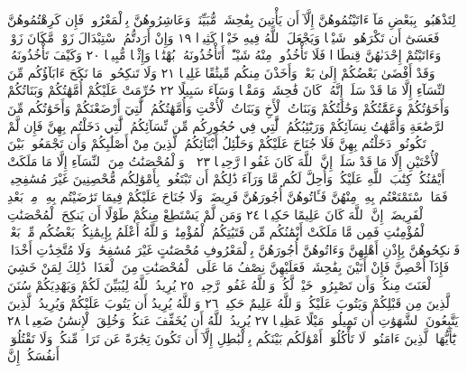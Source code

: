 لِتَذْهَبُوا۟ بِبَعْضِ مَآ ءَاتَيْتُمُوهُنَّ إِلَّآ أَن يَأْتِينَ بِفَٰحِشَةࣲ
مُّبَيِّنَةࣲۚ وَعَاشِرُوهُنَّ بِٱلْمَعْرُوفِۚ فَإِن كَرِهْتُمُوهُنَّ فَعَسَىٰٓ
أَن تَكْرَهُوا۟ شَيْـࣰٔا وَيَجْعَلَ ٱللَّهُ فِيهِ خَيْرࣰا كَثِيرࣰا ١٩
وَإِنْ أَرَدتُّمُ ٱسْتِبْدَالَ زَوْجࣲ مَّكَانَ زَوْجࣲ وَءَاتَيْتُمْ
إِحْدَىٰهُنَّ قِنطَارࣰا فَلَا تَأْخُذُوا۟ مِنْهُ شَيْـًٔاۚ أَتَأْخُذُونَهُۥ
بُهْتَٰنࣰا وَإِثْمࣰا مُّبِينࣰا ٢٠ وَكَيْفَ تَأْخُذُونَهُۥ وَقَدْ أَفْضَىٰ
بَعْضُكُمْ إِلَىٰ بَعْضࣲ وَأَخَذْنَ مِنكُم مِّيثَٰقًا غَلِيظࣰا ٢١
وَلَا تَنكِحُوا۟ مَا نَكَحَ ءَابَآؤُكُم مِّنَ ٱلنِّسَآءِ
إِلَّا مَا قَدْ سَلَفَۚ إِنَّهُۥ كَانَ فَٰحِشَةࣰ وَمَقْتࣰا وَسَآءَ
سَبِيلًا ٢٢ حُرِّمَتْ عَلَيْكُمْ أُمَّهَٰتُكُمْ وَبَنَاتُكُمْ
وَأَخَوَٰتُكُمْ وَعَمَّٰتُكُمْ وَخَٰلَٰتُكُمْ وَبَنَاتُ
ٱلْأَخِ وَبَنَاتُ ٱلْأُخْتِ وَأُمَّهَٰتُكُمُ ٱلَّٰتِيٓ أَرْضَعْنَكُمْ
وَأَخَوَٰتُكُم مِّنَ ٱلرَّضَٰعَةِ وَأُمَّهَٰتُ نِسَآئِكُمْ
وَرَبَٰٓئِبُكُمُ ٱلَّٰتِي فِي حُجُورِكُم مِّن نِّسَآئِكُمُ
ٱلَّٰتِي دَخَلْتُم بِهِنَّ فَإِن لَّمْ تَكُونُوا۟ دَخَلْتُم بِهِنَّ فَلَا
جُنَاحَ عَلَيْكُمْ وَحَلَٰٓئِلُ أَبْنَآئِكُمُ ٱلَّذِينَ مِنْ
أَصْلَٰبِكُمْ وَأَن تَجْمَعُوا۟ بَيْنَ ٱلْأُخْتَيْنِ إِلَّا
مَا قَدْ سَلَفَۗ إِنَّ ٱللَّهَ كَانَ غَفُورࣰا رَّحِيمࣰا ٢٣
۞ وَٱلْمُحْصَنَٰتُ مِنَ ٱلنِّسَآءِ إِلَّا مَا مَلَكَتْ أَيْمَٰنُكُمْۖ
كِتَٰبَ ٱللَّهِ عَلَيْكُمْۚ وَأُحِلَّ لَكُم مَّا وَرَآءَ ذَٰلِكُمْ أَن تَبْتَغُوا۟
بِأَمْوَٰلِكُم مُّحْصِنِينَ غَيْرَ مُسَٰفِحِينَۚ فَمَا ٱسْتَمْتَعْتُم بِهِۦ
مِنْهُنَّ فَـَٔاتُوهُنَّ أُجُورَهُنَّ فَرِيضَةࣰۚ وَلَا جُنَاحَ عَلَيْكُمْ فِيمَا
تَرَٰضَيْتُم بِهِۦ مِنۢ بَعْدِ ٱلْفَرِيضَةِۚ إِنَّ ٱللَّهَ كَانَ عَلِيمًا
حَكِيمࣰا ٢٤ وَمَن لَّمْ يَسْتَطِعْ مِنكُمْ طَوْلًا أَن يَنكِحَ
ٱلْمُحْصَنَٰتِ ٱلْمُؤْمِنَٰتِ فَمِن مَّا مَلَكَتْ أَيْمَٰنُكُم مِّن
فَتَيَٰتِكُمُ ٱلْمُؤْمِنَٰتِۚ وَٱللَّهُ أَعْلَمُ بِإِيمَٰنِكُمۚ بَعْضُكُم
مِّنۢ بَعْضࣲۚ فَٱنكِحُوهُنَّ بِإِذْنِ أَهْلِهِنَّ وَءَاتُوهُنَّ أُجُورَهُنَّ
بِٱلْمَعْرُوفِ مُحْصَنَٰتٍ غَيْرَ مُسَٰفِحَٰتࣲ وَلَا مُتَّخِذَٰتِ
أَخْدَانࣲۚ فَإِذَآ أُحْصِنَّ فَإِنْ أَتَيْنَ بِفَٰحِشَةࣲ فَعَلَيْهِنَّ نِصْفُ
مَا عَلَى ٱلْمُحْصَنَٰتِ مِنَ ٱلْعَذَابِۚ ذَٰلِكَ لِمَنْ خَشِيَ ٱلْعَنَتَ
مِنكُمْۚ وَأَن تَصْبِرُوا۟ خَيْرࣱ لَّكُمْۗ وَٱللَّهُ غَفُورࣱ رَّحِيمࣱ ٢٥
يُرِيدُ ٱللَّهُ لِيُبَيِّنَ لَكُمْ وَيَهْدِيَكُمْ سُنَنَ ٱلَّذِينَ
مِن قَبْلِكُمْ وَيَتُوبَ عَلَيْكُمْۗ وَٱللَّهُ عَلِيمٌ حَكِيمࣱ ٢٦
وَٱللَّهُ يُرِيدُ أَن يَتُوبَ عَلَيْكُمْ وَيُرِيدُ ٱلَّذِينَ يَتَّبِعُونَ
ٱلشَّهَوَٰتِ أَن تَمِيلُوا۟ مَيْلًا عَظِيمࣰا ٢٧ يُرِيدُ ٱللَّهُ أَن يُخَفِّفَ
عَنكُمْۚ وَخُلِقَ ٱلْإِنسَٰنُ ضَعِيفࣰا ٢٨ يَٰٓأَيُّهَا ٱلَّذِينَ ءَامَنُوا۟
لَا تَأْكُلُوٓا۟ أَمْوَٰلَكُم بَيْنَكُم بِٱلْبَٰطِلِ إِلَّآ أَن تَكُونَ
تِجَٰرَةً عَن تَرَاضࣲ مِّنكُمْۚ وَلَا تَقْتُلُوٓا۟ أَنفُسَكُمْۚ إِنَّ
